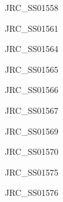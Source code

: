 \documentclass[17pt]{extarticle}
\begin{document}
\newpage\vspace*{-0.15cm}
\begin{large}
JRC\_SS01558 \\[0.5em]
\end{large}

\newpage\vspace*{-0.15cm}
\begin{large}
JRC\_SS01561 \\[0.5em]
\end{large}

\newpage\vspace*{-0.15cm}
\begin{large}
JRC\_SS01564 \\[0.5em]
\end{large}

\newpage\vspace*{-0.15cm}
\begin{large}
JRC\_SS01565 \\[0.5em]
\end{large}

\newpage\vspace*{-0.15cm}
\begin{large}
JRC\_SS01566 \\[0.5em]
\end{large}

\newpage\vspace*{-0.15cm}
\begin{large}
JRC\_SS01567 \\[0.5em]
\end{large}

\newpage\vspace*{-0.15cm}
\begin{large}
JRC\_SS01569 \\[0.5em]
\end{large}

\newpage\vspace*{-0.15cm}
\begin{large}
JRC\_SS01570 \\[0.5em]
\end{large}

\newpage\vspace*{-0.15cm}
\begin{large}
JRC\_SS01575 \\[0.5em]
\end{large}

\newpage\vspace*{-0.15cm}
\begin{large}
JRC\_SS01576 \\[0.5em]
\end{large}
\end{document}
